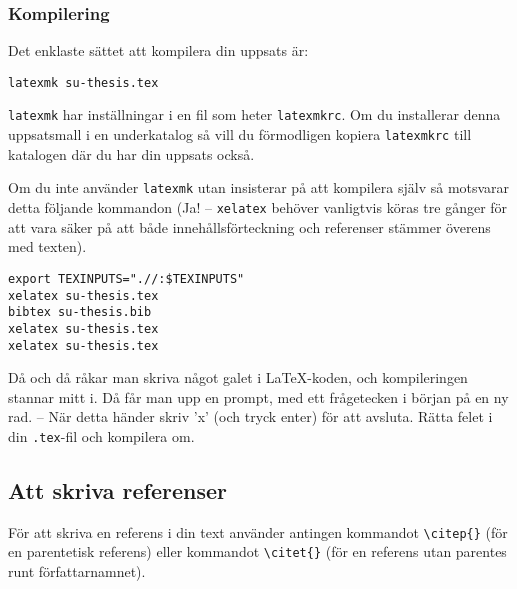 \subsubsection{Kompilering}

Det enklaste sättet att kompilera din uppsats är:

\begin{verbatim}
latexmk su-thesis.tex
\end{verbatim}

\noindent\texttt{latexmk} har inställningar i en fil som heter
\texttt{latexmkrc}. Om du installerar denna uppsatsmall i en underkatalog så
vill du förmodligen kopiera \texttt{latexmkrc} till katalogen där du har din
uppsats också.

Om du inte använder \texttt{latexmk} utan insisterar på att kompilera
själv så motsvarar detta följande kommandon (Ja! -- \texttt{xelatex} behöver
vanligtvis köras tre gånger för att vara säker på att både innehållsförteckning
och referenser stämmer överens med texten).

\begin{verbatim}
export TEXINPUTS=".//:$TEXINPUTS"
xelatex su-thesis.tex
bibtex su-thesis.bib
xelatex su-thesis.tex
xelatex su-thesis.tex
\end{verbatim}

\noindent Då och då råkar man skriva något galet i \LaTeX-koden, och kompileringen
stannar mitt i. Då får man upp en prompt, med ett frågetecken i början på en ny
rad. -- När detta händer skriv 'x' (och tryck enter) för att avsluta. Rätta
felet i din \texttt{.tex}-fil och kompilera om.


\subsection{Att skriva referenser}

För att skriva en referens i din text använder antingen kommandot
\texttt{\textbackslash{}citep\{\}} (för en parentetisk referens) eller
kommandot \texttt{\textbackslash{}citet\{\}} (för en referens utan parentes
runt författarnamnet).

